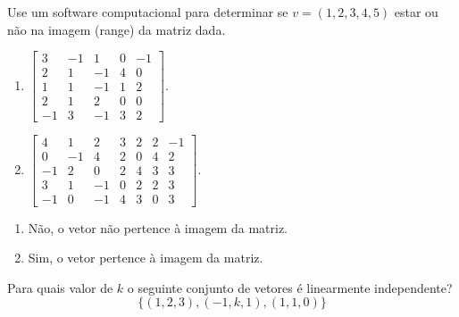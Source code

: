 \begin{question}
  Use um software computacional para determinar se $v = (1, 2, 3, 4, 5)$ estar ou não na imagem (range) da matriz dada.
  \begin{multicols}{2}
    \begin{enumerate}[label=\alph*)]
      \item $\begin{bmatrix}
                3  & -1 & 1  & 0 & -1 \\
                2  & 1  & -1 & 4 & 0  \\
                1  & 1  & -1 & 1 & 2  \\
                2  & 1  & 2  & 0 & 0  \\
                -1 & 3  & -1 & 3 & 2
              \end{bmatrix}$.
      \item $\begin{bmatrix}
                4  & 1  & 2  & 3 & 2 & 2 & -1 \\
                0  & -1 & 4  & 2 & 0 & 4 & 2  \\
                -1 & 2  & 0  & 2 & 4 & 3 & 3  \\
                3  & 1  & -1 & 0 & 2 & 2 & 3  \\
                -1 & 0  & -1 & 4 & 3 & 0 & 3
              \end{bmatrix}$.
    \end{enumerate}
  \end{multicols}
  \vspace{8pt}
\end{question}

\begin{resolution}
  \vspace{-24pt}
  \begin{enumerate}[label=\alph*)]
    \item Não, o vetor não pertence à imagem da matriz.
    \item Sim, o vetor pertence à imagem da matriz.
  \end{enumerate}
\end{resolution}

\begin{question}
  Para quais valor de $k$ o seguinte conjunto de vetores é linearmente independente?
  \vspace{-12pt}
  $$\{(1, 2, 3), (-1, k, 1), (1, 1, 0)\}$$
\end{question}

